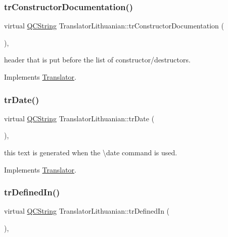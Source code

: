 \subsubsection{\texorpdfstring{trConstructorDocumentation()}{trConstructorDocumentation()}}
{\footnotesize\ttfamily virtual \mbox{\hyperlink{class_q_c_string}{Q\+C\+String}} Translator\+Lithuanian\+::tr\+Constructor\+Documentation (\begin{DoxyParamCaption}{ }\end{DoxyParamCaption})\hspace{0.3cm}{\ttfamily [inline]}, {\ttfamily [virtual]}}

header that is put before the list of constructor/destructors. 

Implements \mbox{\hyperlink{class_translator}{Translator}}.

\mbox{\label{class_translator_lithuanian_a5ea34ef7f532eeeae44c58d6b4de24c1}} 
\subsubsection{\texorpdfstring{trDate()}{trDate()}}
{\footnotesize\ttfamily virtual \mbox{\hyperlink{class_q_c_string}{Q\+C\+String}} Translator\+Lithuanian\+::tr\+Date (\begin{DoxyParamCaption}{ }\end{DoxyParamCaption})\hspace{0.3cm}{\ttfamily [inline]}, {\ttfamily [virtual]}}

this text is generated when the \textbackslash{}date command is used. 

Implements \mbox{\hyperlink{class_translator}{Translator}}.

\mbox{\label{class_translator_lithuanian_a32add55ffd8906b228479c3206883629}} 
\subsubsection{\texorpdfstring{trDefinedIn()}{trDefinedIn()}}
{\footnotesize\ttfamily virtual \mbox{\hyperlink{class_q_c_string}{Q\+C\+String}} Translator\+Lithuanian\+::tr\+Defined\+In (\begin{DoxyParamCaption}{ }\end{DoxyParamCaption})\hspace{0.3cm}{\ttfamily [inline]}, {\ttfamily [virtual]}}

